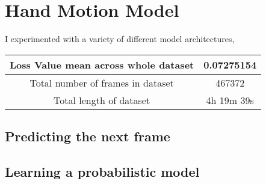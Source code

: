\chapter{Hand Motion Model}
\label{C:hand-model}


I experimented with a variety of different model architectures,


\begin{tabular}{ | c | c |}
    \hline
    Loss Value mean across whole dataset & 0.07275154 \\
    \hline
    Total number of frames in dataset & 467372 \\
    \hline
    Total length of dataset & 4h 19m 39s
\end{tabular}


\section{Predicting the next frame}
\label{S:mean-model}


\section{Learning a probabilistic model}
\label{S:prob-model}
